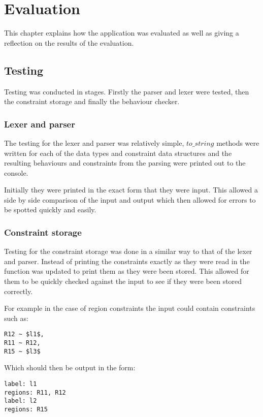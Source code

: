 \chapter{Evaluation} \label{chaptest}

This chapter explains how the application was evaluated as well as giving a reflection on the results of the evaluation.

\section{Testing}

Testing was conducted in stages. Firstly the parser and lexer were tested, then the constraint storage and finally the behaviour checker.

\subsection{Lexer and parser}

The testing for the lexer and parser was relatively simple, $to\_string$ methods were written for each of the data types and constraint data structures and the resulting behaviours and constraints from the parsing were printed out to the console. 

Initially they were printed in the exact form that they were input. This allowed a side by side comparison of the input and output which then allowed for errors to be spotted quickly and easily. 

\subsection{Constraint storage}

Testing for the constraint storage was done in a similar way to that of the lexer and parser. Instead of printing the constraints exactly as they were read in the function was updated to print them as they were been stored. This allowed for them to be quickly checked against the input to see if they were been stored correctly. 

For example in the case of region constraints the input could contain constraints such as: 

\begin{lstlisting}
R12 ~ $l1$, 
R11 ~ R12,
R15 ~ $l3$
\end{lstlisting}

Which should then be output in the form: 

\begin{lstlisting}
label: l1
regions: R11, R12
label: l2
regions: R15
\end{lstlisting}

